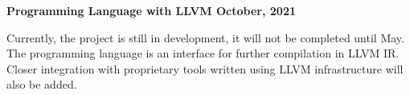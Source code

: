 \textbf{ {Programming Language with LLVM} \hfill  October, 2021} \par
\begin{itemize}
Currently, the project is still in development, it will not be completed until May. The programming language is an interface for further compilation in LLVM IR. Closer integration with proprietary tools written using LLVM infrastructure will also be added.
\end{itemize} \par